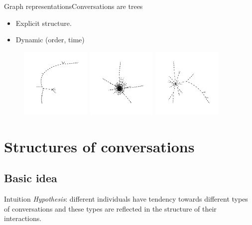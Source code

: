 \documentclass{beamer}
\begin{document}
\begin{frame}{Graph representations}{Conversations are trees}

\begin{itemize}
\item Explicit structure.
\item Dynamic (order, time)
\end{itemize}
\begin{figure}
	\centering
	\includegraphics[width=0.3\textwidth]{tree1}	
	\includegraphics[width=0.3\textwidth]{tree2}	
	\includegraphics[width=0.3\textwidth]{tree4}	
\end{figure}
\end{frame}

\section{Structures of conversations}
\subsection{Basic idea}
\begin{frame}{Intuition}
\textit{Hypothesis}: different individuals have tendency towards different types of conversations and these types are reflected in the structure of their interactions.

\end{frame}
\end{document}
